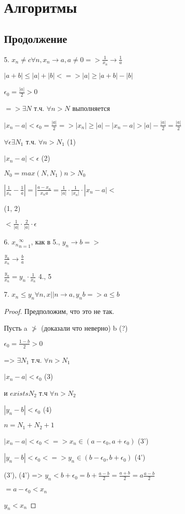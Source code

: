 


\chapter{Алгоритмы}


\section{Продолжение}



5. $x_n \neq c \forall n, x_n \to a, a \neq 0 => \frac{1}{x_n} \to \frac{1}{a}$

$|a + b| \leq |a| + |b| <=> |a| \geq |a + b| - |b|$



$\epsilon_0 = \frac{|a|}{2} > 0$

$=> \exists N$ т.ч. $\forall n > N$ выполняется

$|x_n-a| < \epsilon_0 = \frac{|a|}{2} => |x_n| \geq |a| - |x_n - a| > |a| - \frac{|a|}{2} = \frac{|a|}{2}$

$\forall \epsilon \exists N_1$ т.ч. $\forall n > N_1$ (1)

$|x_n - a| < \epsilon$ (2)

$N_0 = max(N, N_1) n> N_0$

$|\frac{1}{x_n} - \frac{1}{a}| = |\frac{a - x_n}{x_n a} = \frac{1}{|a|} \cdot \frac{1}{|x_n|} \cdot |x_n - a| < $

(1, 2)

$< \frac{1}{|a|} \cdot \frac{2}{|a|} \cdot \epsilon$

6. ${x_n}_{n=1}^{\infty}$, как в 5., $y_n \to b => $

$\frac{y_n}{x_n} \to \frac{b}{a}$

$\frac{y_n}{x_n} = y_n \cdot \frac{1}{x_n}$
4., 5

7. $x_n \leq y_n \forall n, x||n \to a, y_n b => a \leq b$

\begin{proof}
    Предположим, что это не так.

    Пусть a $\ngtr$ (доказали что неверно) b (?)

    $\epsilon_0 = \frac{1 - b}{2} > 0$

    => $\exists N_1$ т.ч. $\forall n > N_1$


    $|x_n - a| < \epsilon_0$ (3)

    и $exists N_2$ т.ч $\forall n > N_2$

    $|y_n - b| < \epsilon_0$ (4)

    $n = N_1 + N_2 + 1$

    $|x_n - a| < \epsilon_0 <=> x_n \in (a - \epsilon_0, a + \epsilon_0)$ (3')

    $|y_n - b| < \epsilon_0 <=> y_n \in (b - \epsilon_0, b + \epsilon_0)$ (4')

    (3'), (4') => $y_n < b + \epsilon_0 = b + \frac{a - b}{2} = \frac{a + b}{2} = a \frac{a - b}{2}$

    $ = a - \epsilon_0 < x_n$

    $y_n < x_n$
\end{proof}


